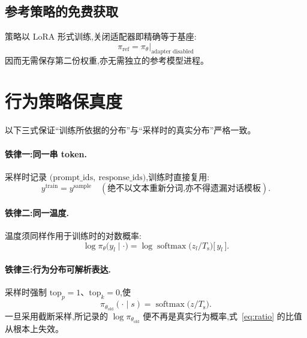 \documentclass[UTF8, 11pt]{ctexart}
\DeclareMathOperator{\softmax}{softmax}
\begin{document}
\subsection{参考策略的免费获取}

策略以 LoRA 形式训练,关闭适配器即精确等于基座:
\begin{equation}
\boxed{\;\pi_{\text{ref}}=\pi_{\theta}\big\rvert_{\text{adapter disabled}}\;}
\label{eq:ref}
\end{equation}
因而无需保存第二份权重,亦无需独立的参考模型进程。

\section{行为策略保真度}

以下三式保证“训练所依据的分布”与“采样时的真实分布”严格一致。

\paragraph{铁律一:同一串 token.}
采样时记录 $\bigl(\text{prompt\_ids},\ \text{response\_ids}\bigr)$,训练时直接复用:
\begin{equation}
y^{\text{train}}=y^{\text{sample}}
\quad(\text{绝不以文本重新分词,亦不得遗漏对话模板}).
\label{eq:sametoken}
\end{equation}

\paragraph{铁律二:同一温度.}
温度须同样作用于训练时的对数概率:
\begin{equation}
\log\pi_\theta\bigl(y_l\mid\cdot\bigr)
=\log\softmax\bigl(z_l/T_{\text{s}}\bigr)\bigl[\,y_l\,\bigr].
\label{eq:temp}
\end{equation}

\paragraph{铁律三:行为分布可解析表达.}
采样时强制 $\text{top}_p=1$、$\text{top}_k=0$,使
\begin{equation}
\pi_{\theta_{\text{old}}}(\cdot\mid s)=\softmax\bigl(z/T_{\text{s}}\bigr).
\label{eq:notrunc}
\end{equation}
一旦采用截断采样,所记录的 $\log\pi_{\theta_{\text{old}}}$ 便不再是真实行为概率,式~\eqref{eq:ratio} 的比值从根本上失效。
\end{document}

